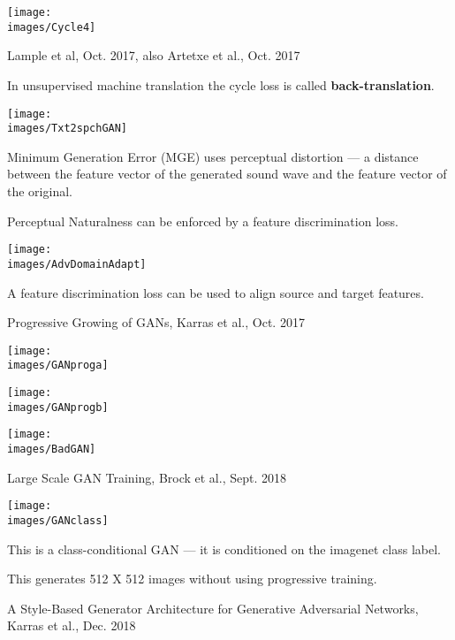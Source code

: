 {

\centerline{\texttt{[image: \\images/Cycle4]}}

         {Lample et al, Oct. 2017, also Artetxe et al., Oct. 2017}


In unsupervised machine translation the cycle loss is called {\bf back-translation}.


\centerline{\texttt{[image: \\images/Txt2spchGAN]}}

\vfill
Minimum Generation Error (MGE) uses {\color{red} perceptual distortion} ---
a distance between the feature vector of the generated sound wave and the
feature vector of the original.

\vfill
{\color{red}Perceptual Naturalness} can be enforced by a feature discrimination loss.


\centerline{\texttt{[image: \\images/AdvDomainAdapt]}}

A feature discrimination loss can be used to align source and target features.


\centerline{Progressive Growing of GANs, Karras et al., Oct. 2017}

\centerline{\texttt{[image: \\images/GANproga]}}


\centerline{\texttt{[image: \\images/GANprogb]}}


\centerline{\texttt{[image: \\images/BadGAN]}}

\centerline{Large Scale GAN Training, Brock et al., Sept. 2018}
\centerline{\texttt{[image: \\images/GANclass]}}

\vfill
This is a class-conditional GAN --- it is conditioned on the imagenet class label.

\vfill
This generates 512 X 512 images without using progressive training.

{\Large A Style-Based Generator Architecture for Generative Adversarial Networks, Karras et al., Dec. 2018}

}
